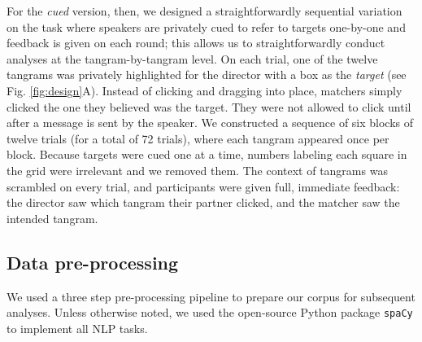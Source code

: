 \documentclass[alpha-refs]{wiley-article}
\begin{document}
For the \emph{cued} version, then, we designed a straightforwardly sequential variation on the task where speakers are privately cued to refer to targets one-by-one and feedback is given on each round; this allows us to straightforwardly conduct analyses at the tangram-by-tangram level. On each trial, one of the twelve tangrams was privately highlighted for the director with a box as the \emph{target} (see Fig. \ref{fig:design}A). Instead of clicking and dragging into place, matchers simply clicked the one they believed was the target. They were not allowed to click until after a message is sent by the speaker.  We constructed a sequence of six blocks of twelve trials (for a total of 72 trials), where each tangram appeared once per block.%
Because targets were cued one at a time, numbers labeling each square in the grid were irrelevant and we removed them. The context of tangrams was scrambled on every trial, and participants were given full, immediate feedback: the director saw which tangram their partner clicked, and the matcher saw the intended tangram.

\subsection{Data pre-processing}

We used a three step pre-processing pipeline to prepare our corpus for subsequent analyses. Unless otherwise noted, we used the open-source Python package \texttt{spaCy} to implement all NLP tasks. 
\end{document}
